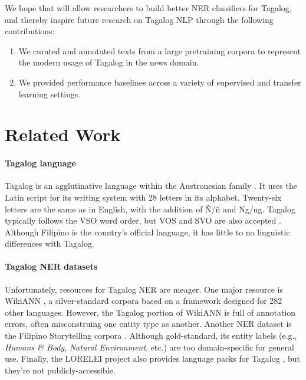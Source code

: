\documentclass[11pt]{article}
\begin{document}
We hope that \tlunified{} will allow researchers to build better NER classifiers for Tagalog, and thereby inspire future research on Tagalog NLP through the following contributions:

\begin{enumerate}
  \item We curated and annotated texts from a large pretraining corpora to represent the modern usage of Tagalog in the news domain.
  \item We provided performance baselines across a variety of supervised and transfer learning settings.
\end{enumerate}

\section{Related Work}




\paragraph{Tagalog language} 
Tagalog is an agglutinative language within the Austronesian family \cite{Kroeger1992PhraseSA}. 
It uses the Latin script for its writing system with 28 letters in its alphabet. 
Twenty-six letters are the same as in English, with the addition of \~{N}/\~{n} and Ng/ng.
Tagalog typically follows the VSO word order, but VOS and SVO are also accepted \citep{Schachter1973TagalogRG}.
Although Filipino is the country's official language, it has little to no linguistic differences with Tagalog.

\paragraph{Tagalog NER datasets}
Unfortunately, resources for Tagalog NER are meager.
One major resource is WikiANN \cite{Pan2017CrosslingualNT}, a silver-standard corpora based on a framework designed for 282 other languages.  
However, the Tagalog portion of WikiANN is full of annotation errors, often misconstruing one entity type as another.
Another NER dataset is the Filipino Storytelling corpora \cite{Costiniano2022CustomCG}. 
Although gold-standard, its entity labels (e.g., \textit{Humans \& Body}, \textit{Natural Environment}, etc.) are too domain-specific for general use.
Finally, the LORELEI project also provides language packs for Tagalog \cite{Strassel2016LORELEILP}, but they're not publicly-accessible.
\end{document}
